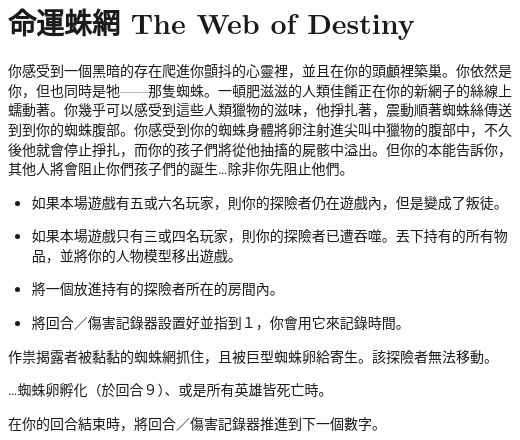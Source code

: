 
\chapter{命運蛛網 The Web of Destiny}

\begin{HauntStory}
  你感受到一個黑暗的存在爬進你顫抖的心靈裡，並且在你的頭顱裡築巢。你依然是你，但也同時是牠——那隻蜘蛛。一頓肥滋滋的人類佳餚正在你的新網子的絲線上蠕動著。你幾乎可以感受到這些人類獵物的滋味，他掙扎著，震動順著蜘蛛絲傳送到到你的蜘蛛腹部。你感受到你的蜘蛛身體將卵注射進尖叫中獵物的腹部中，不久後他就會停止掙扎，而你的孩子們將從他抽搐的屍骸中溢出。但你的本能告訴你，其他人將會阻止你們孩子們的誕生…除非你先阻止他們。
\end{HauntStory}

\vspace*{-1em}
\begin{itemize}
  \item 如果本場遊戲有五或六名玩家，則你的探險者仍在遊戲內，但是變成了叛徒。
  \item 如果本場遊戲只有三或四名玩家，則你的探險者已遭吞噬。丟下持有的所有物品，並將你的人物模型移出遊戲。
  \item 將一個放進持有的探險者所在的房間內。
  \item 將回合／傷害記錄器設置好並指到１，你會用它來記錄時間。
\end{itemize}

作祟揭露者被黏黏的蜘蛛網抓住，且被巨型蜘蛛卵給寄生。該探險者無法移動。

…蜘蛛卵孵化（於回合９）、或是所有英雄皆死亡時。

在你的回合結束時，將回合／傷害記錄器推進到下一個數字。

\vfill\null\pagebreak


